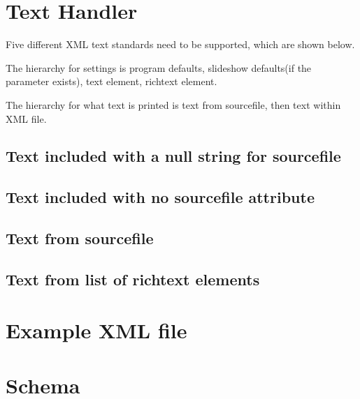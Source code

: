 \documentclass[oneside]{article}
\begin{document}
\clearpage
\section{Text Handler}
Five different XML text standards need to be supported, which are shown below.

The hierarchy for settings is program defaults, slideshow defaults(if the parameter exists), text element, richtext element.

The hierarchy for what text is printed is text from sourcefile, then text within XML file.
\subsection{Text included with a null string for sourcefile}
\lstset{language=XML}


\subsection{Text included with no sourcefile attribute}


\subsection{Text from sourcefile}


\subsection{Text from list of richtext elements}

	
\clearpage

\section{Example XML file}
\small
\lstset{language=XML}


\clearpage

\section{Schema}
\lstset{language=XML}

\end{document}
